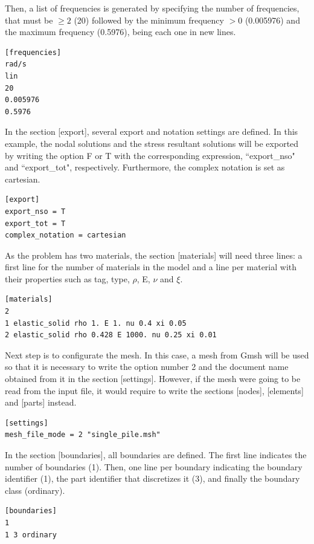 \documentclass[a4]{article}
\begin{document}
Then, a list of frequencies is generated by specifying the number of frequencies, that must be $\geq 2$ (20) followed by the minimum frequency $>0$ (0.005976) and the maximum frequency (0.5976), being each one in new lines.

\begin{Verbatim}
[frequencies]
rad/s
lin
20
0.005976
0.5976
\end{Verbatim}

In the section [export], several export and notation settings are defined. In this example, the nodal solutions and the stress resultant solutions will be exported by writing the option F or T with the corresponding expression, ``export\_nso" and ``export\_tot", respectively. Furthermore, the complex notation is set as cartesian. 

\begin{Verbatim}
[export]
export_nso = T
export_tot = T
complex_notation = cartesian
\end{Verbatim}

As the problem has two materials, the section [materials] will need three lines: a first line for the number of materials in the model and a line per material with their properties such as tag, type, $\rho$, E, $\nu$ and $ \xi $.

\begin{Verbatim}
[materials]
2
1 elastic_solid rho 1. E 1. nu 0.4 xi 0.05
2 elastic_solid rho 0.428 E 1000. nu 0.25 xi 0.01
\end{Verbatim}

Next step is to configurate the mesh. In this case, a mesh from Gmsh will be used so that it is necessary to write the option number 2 and the document name obtained from it in the section [settings]. However, if the mesh were going to be read from the input file, it would require to write the sections [nodes], [elements] and [parts] instead.

\begin{Verbatim}	
[settings]
mesh_file_mode = 2 "single_pile.msh"
\end{Verbatim}

In the section [boundaries], all boundaries are defined. The first line indicates the number of boundaries (1). Then, one line per boundary indicating the boundary identifier (1), the part identifier that discretizes it (3), and finally the boundary class (ordinary).

\begin{Verbatim}
[boundaries]
1
1 3 ordinary
\end{Verbatim}
\end{document}
